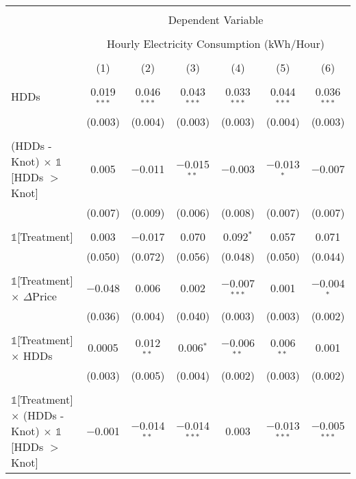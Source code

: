 
\begin{table}[!htbp] \centering 
  \label{Table:Breakdown-of-Average-Treatement-Effects-in-the-Peak-Rate-Period_As-a-Function-of-Rate-Changes} 
\scriptsize
\begin{longtable}{@{\extracolsep{15pt}}lcccccc} 
\\[-1.8ex]\hline 
\hline \\[-1.8ex] 
 & \multicolumn{6}{c}{Dependent Variable} \\ 
\cline{2-7} 
\\[-1.8ex] & \multicolumn{6}{c}{Hourly Electricity Consumption  (kWh/Hour)} \\ 
\\[-1.8ex] & (1) & (2) & (3) & (4) & (5) & (6)\\ 
\hline \\[-1.8ex] \endhead
 HDDs & 0.019$^{***}$ & 0.046$^{***}$ & 0.043$^{***}$ & 0.033$^{***}$ & 0.044$^{***}$ & 0.036$^{***}$ \\ 
  & (0.003) & (0.004) & (0.003) & (0.003) & (0.004) & (0.003) \\ 
  & & & & & & \\ 
 (HDDs - Knot) $\times$ $\mathbb{1}$[HDDs $>$ Knot] & 0.005 & $-$0.011 & $-$0.015$^{**}$ & $-$0.003 & $-$0.013$^{*}$ & $-$0.007 \\ 
  & (0.007) & (0.009) & (0.006) & (0.008) & (0.007) & (0.007) \\ 
  & & & & & & \\ 
 $\mathbb{1}$[Treatment] & 0.003 & $-$0.017 & 0.070 & 0.092$^{*}$ & 0.057 & 0.071 \\ 
  & (0.050) & (0.072) & (0.056) & (0.048) & (0.050) & (0.044) \\ 
  & & & & & & \\ 
 $\mathbb{1}$[Treatment] $\times$ $\Delta$Price & $-$0.048 & 0.006 & 0.002 & $-$0.007$^{***}$ & 0.001 & $-$0.004$^{*}$ \\ 
  & (0.036) & (0.004) & (0.040) & (0.003) & (0.003) & (0.002) \\ 
  & & & & & & \\ 
 $\mathbb{1}$[Treatment] $\times$ HDDs & 0.0005 & 0.012$^{**}$ & 0.006$^{*}$ & $-$0.006$^{**}$ & 0.006$^{**}$ & 0.001 \\ 
  & (0.003) & (0.005) & (0.004) & (0.002) & (0.003) & (0.002) \\ 
  & & & & & & \\ 
 $\mathbb{1}$[Treatment] $\times$ (HDDs - Knot) $\times$ $\mathbb{1}$[HDDs $>$ Knot] & $-$0.001 & $-$0.014$^{**}$ & $-$0.014$^{***}$ & 0.003 & $-$0.013$^{***}$ & $-$0.005$^{***}$ \\ 

\end{longtable}
\end{table}
